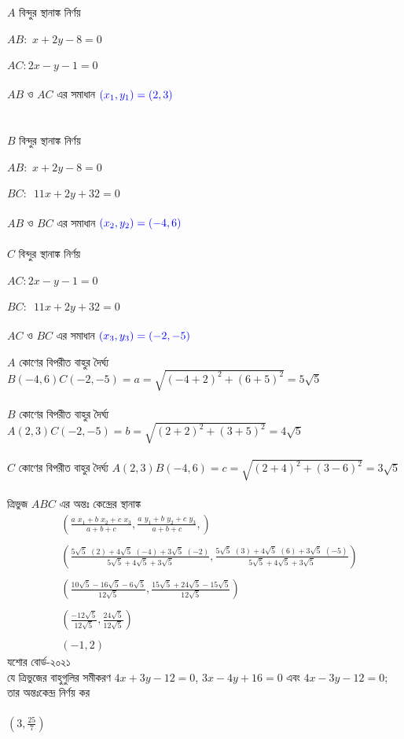 \documentclass{article}
\begin{document}
\vspace{2cm}
\begin{multicols}{3}
$A$ বিন্দুর স্থানাঙ্ক নির্ণয়  \\
\\
$AB : \,\, x+2y-8=0$ \\
\\
$AC: 2x-y-1=0$\\
\\ 
$AB$ ও $AC$ এর সমাধান $\textcolor{blue}{(x_1,y_1)=(2,3)}$\\
\\
\\
$B$ বিন্দুর স্থানাঙ্ক নির্ণয়  \\
\\
$AB : \,\, x+2y-8=0$ \\
\\
$BC:\,\,\,11x+2y+32=0$\\
\\
$AB$ ও $BC$ এর সমাধান $\textcolor{blue}{(x_2,y_2)=(-4,6)}$\\
\\
$C$ বিন্দুর স্থানাঙ্ক নির্ণয়  \\
\\
$AC: 2x-y-1=0$\\
\\ 
$BC:\,\,\,11x+2y+32=0$\\
\\
$AC$ ও $BC$ এর সমাধান $\textcolor{blue}{(x_3,y_3)=(-2,-5)}$\\
\end{multicols}
$A$ কোণের বিপরীত বাহুর দৈর্ঘ্য   $B(-4,6)C(-2,-5)=a=\sqrt{(-4+2)^2+(6+5)^2}=5\sqrt{5}$ \\
\\
$B$ কোণের বিপরীত বাহুর দৈর্ঘ্য    $A(2,3)C(-2,-5)=b=\sqrt{(2+2)^2+(3+5)^2}=4\sqrt{5}$ \\
\\
$C$ কোণের বিপরীত বাহুর দৈর্ঘ্য   $A(2,3)B(-4,6)=c=\sqrt{(2+4)^2+(3-6)^2}=3\sqrt{5}$\\
\\
 ত্রিভুজ $ABC$ এর অন্তঃ কেন্দ্রের স্থানাঙ্ক \\ 
\begin{align*}
	&\left(\frac{a\,\,x_1+b\,\,x_2+c\,\,x_3}{a+b+c},\frac{a\,\,y_1+b\,\,y_2+c\,\,y_3}{a+b+c},\right)\\
	\\
	&\left(\frac{5\sqrt{5}\,\,(2)+4\sqrt{5}\,\,(-4)+3\sqrt{5}\,\,(-2)}{5\sqrt{5}+4\sqrt{5}+3\sqrt{5}},\frac{5\sqrt{5}\,\,(3)+4\sqrt{5}\,\,(6)+3\sqrt{5}\,\,(-5)}{5\sqrt{5}+4\sqrt{5}+3\sqrt{5}}\right)\\
	\\
		&\left(\frac{10\sqrt{5}-16\sqrt{5}-6\sqrt{5}}{12\sqrt{5}},\frac{15\sqrt{5}+24\sqrt{5}-15\sqrt{5}}{12\sqrt{5}}\right)\\
		\\
			&\left(\frac{-12\sqrt{5}}{12\sqrt{5}},\frac{24\sqrt{5}}{12\sqrt{5}}\right)\\
		\\
		&(-1,2)
\end{align*}
	যশোর  বোর্ড-২০২১\\ 
যে ত্রিভুজের বাহুগুলির সমীকরণ 	$4x+3y-12=0$,  $3x-4y+16=0$ এবং  $4x-3y-12=0$; তার অন্তঃকেন্দ্র নির্ণয় কর \\
\\ 
$\left(3,\frac{25}{7}\right)$\\
\end{document}
